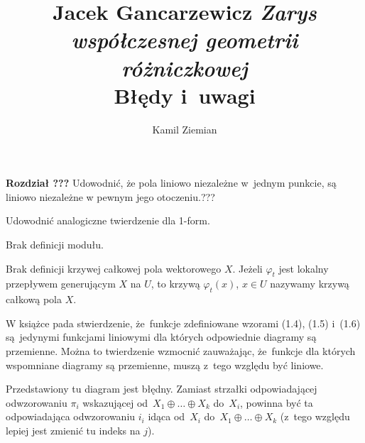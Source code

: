 \documentclass[a4paper,11pt]{article}
\title{Jacek Gancarzewicz
  \textit{Zarys współczesnej geometrii różniczkowej} \\
  {\Large Błędy i~uwagi}}
\author{Kamil Ziemian}
\numberwithin{equation}{section}
\begin{document}





\maketitle %







\noindent
\textbf{Rozdział ???} \Dok Udowodnić, że pola liniowo niezależne w~jednym
punkcie, są liniowo niezależne w pewnym jego otoczeniu.???

\VerSpaceFour





\noindent
Udowodnić analogiczne twierdzenie dla 1-form.

\vspace{\VerSpaceFour}




\noindent
Brak definicji modułu.

\vspace{\VerSpaceFour}





\noindent
Brak definicji krzywej całkowej pola wektorowego $X$. Jeżeli $\varphi_{ t }$ jest
lokalny przepływem generującym $X$ na $U$, to krzywą $\varphi_{ t }( x )$,
$x \in U$ nazywamy krzywą całkową pola $X$.

\vspace{\VerSpaceFour}





\noindent
{} W książce pada stwierdzenie, że~funkcje zdefiniowane wzorami
(1.4), (1.5) i~(1.6) są~jedynymi funkcjami liniowymi dla których
odpowiednie diagramy są przemienne. Można to twierdzenie wzmocnić
zauważając, że~funkcje dla których wspomniane diagramy są przemienne,
muszą z~tego względu być liniowe.

\vspace{\VerSpaceFour}





\noindent
{} Przedstawiony tu diagram jest błędny. Zamiast strzałki
odpowiadającej odwzorowaniu $\pi_{ i }$ wskazującej
od~$X_{ 1 } \oplus \ldots \oplus X_{ k }$ do~$X_{ i }$, powinna być ta odpowiadająca
odwzorowaniu $i_{ i }$ idąca od~$X_{ i }$ do~$X_{ 1 } \oplus \ldots \oplus X_{ k }$ (z~tego
względu lepiej jest zmienić tu indeks na $j$).
\end{document}
